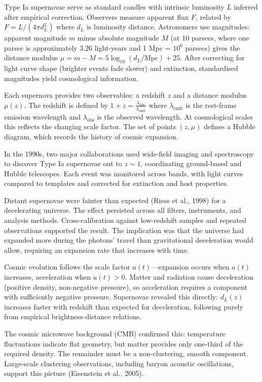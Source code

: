 Type Ia supernovae serve as standard candles with intrinsic luminosity $L$ inferred after empirical correction. Observers measure apparent flux $F$, related by $F = L/(4\pi d_L^2)$ where $d_L$ is luminosity distance. Astronomers use magnitudes: apparent magnitude $m$ minus absolute magnitude $M$ (at 10 parsecs, where one parsec is approximately 3.26 light-years and 1 Mpc = $10^6$ parsecs) gives the distance modulus $\mu = m - M = 5 \log_{10}(d_L/\text{Mpc}) + 25$. After correcting for light curve shape (brighter events fade slower) and extinction, standardised magnitudes yield cosmological information.

Each supernova provides two observables: a redshift $z$ and a distance modulus $\mu(z)$. The redshift is defined by $1 + z = \frac{\lambda_{\text{obs}}}{\lambda_{\text{emit}}}$ where $\lambda_{\text{emit}}$ is the rest-frame emission wavelength and $\lambda_{\text{obs}}$ is the observed wavelength. At cosmological scales this reflects the changing scale factor. The set of points $(z, \mu)$ defines a Hubble diagram, which records the history of cosmic expansion.

In the 1990s, two major collaborations used wide-field imaging and spectroscopy to discover Type Ia supernovae out to $z \sim 1$, coordinating ground-based and Hubble telescopes. Each event was monitored across bands, with light curves compared to templates and corrected for extinction and host properties.

Distant supernovae were fainter than expected (Riess et al., 1998) for a decelerating universe. The effect persisted across all filters, instruments, and analysis methods. Cross-calibration against low-redshift samples and repeated observations supported the result. The implication was that the universe had expanded more during the photons’ travel than gravitational deceleration would allow, requiring an expansion rate that increases with time.

Cosmic evolution follows the scale factor $a(t)$—expansion occurs when $a(t)$ increases, acceleration when $\ddot{a}(t) > 0$. Matter and radiation cause deceleration (positive density, non-negative pressure), so acceleration requires a component with sufficiently negative pressure. Supernovae revealed this directly: $d_L(z)$ increases faster with redshift than expected for deceleration, following purely from empirical brightness-distance relations.

The cosmic microwave background (CMB) confirmed this: temperature fluctuations indicate flat geometry, but matter provides only one-third of the required density. The remainder must be a non-clustering, smooth component. Large-scale clustering observations, including baryon acoustic oscillations, support this picture (Eisenstein et al., 2005).

